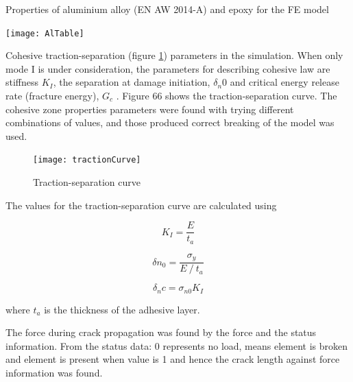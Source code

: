 \documentclass[numbers=noendperiod,chapterprefix=on]{icldt} %
\begin{document}
\begin{table}[!htpb]
\centering
\caption{Properties of aluminium alloy (EN AW 2014-A) \cite{Brett2011} and epoxy \cite{Adnan2008} for the FE model} \label{AlTable}
\texttt{[image: AlTable]}
\end{table}
\FloatBarrier

Cohesive traction-separation (figure \ref{tractionCurve}) parameters in the simulation. When only mode I is under consideration, the parameters for describing cohesive law are stiffness $K_I$, the separation at damage initiation, $\delta_n0$ and critical energy release rate (fracture energy), $G_c$ \cite{Brett2011}. Figure 66 shows the traction-separation curve. The cohesive zone properties parameters were found with trying different combinations of values, and those produced correct breaking of the model was used.

\begin{figure}[!htpb]
\centering
\texttt{[image: tractionCurve]}
\caption{Traction-separation curve \cite{Brett2011}}\label{tractionCurve}
\end{figure}
\FloatBarrier

The values for the traction-separation curve are calculated using \cite{Brett2011}

\begin{equation} 
K_I  =\frac{E}{t_a}
\end{equation}

\begin{equation} 
\delta n_0=\frac{\sigma_y}{E⁄t_a}
\end{equation}

\begin{equation} 
\delta_nc=\sigma_{n0} K_I
\end{equation}

where $t_{a}$ is the thickness of the adhesive layer. 

The force during crack propagation was found by the force and the status information.
From the status data: 0 represents no load, means element is broken and element is present when value is 1 and hence the crack length against force information was found.
\end{document}
